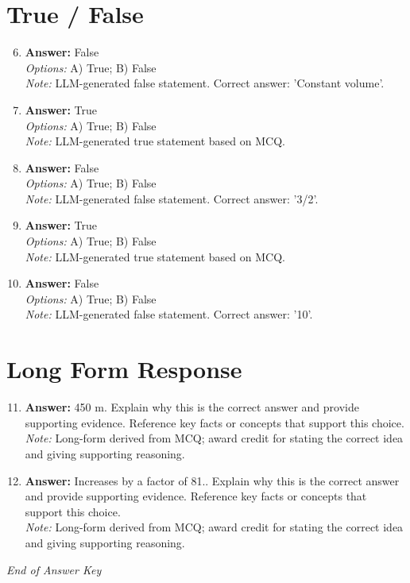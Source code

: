 \documentclass[12pt]{article}
\begin{document}
\section*{True / False}
\begin{enumerate}[label=\arabic*.]
\setcounter{enumi}{5}
\item \textbf{Answer:} False
\\ \textit{Options:} A) True; B) False
\\ \textit{Note:} LLM-generated false statement. Correct answer: 'Constant volume'.
\item \textbf{Answer:} True
\\ \textit{Options:} A) True; B) False
\\ \textit{Note:} LLM-generated true statement based on MCQ.
\item \textbf{Answer:} False
\\ \textit{Options:} A) True; B) False
\\ \textit{Note:} LLM-generated false statement. Correct answer: '3/2'.
\item \textbf{Answer:} True
\\ \textit{Options:} A) True; B) False
\\ \textit{Note:} LLM-generated true statement based on MCQ.
\item \textbf{Answer:} False
\\ \textit{Options:} A) True; B) False
\\ \textit{Note:} LLM-generated false statement. Correct answer: '10'.
\end{enumerate}

\section*{Long Form Response}
\begin{enumerate}[label=\arabic*.]
\setcounter{enumi}{10}
\item \textbf{Answer:} 450 m. Explain why this is the correct answer and provide supporting evidence. Reference key facts or concepts that support this choice.
\\ \textit{Note:} Long-form derived from MCQ; award credit for stating the correct idea and giving supporting reasoning.
\item \textbf{Answer:} Increases by a factor of 81.. Explain why this is the correct answer and provide supporting evidence. Reference key facts or concepts that support this choice.
\\ \textit{Note:} Long-form derived from MCQ; award credit for stating the correct idea and giving supporting reasoning.
\end{enumerate}

\vfill
\noindent\textit{End of Answer Key}
\end{document}
